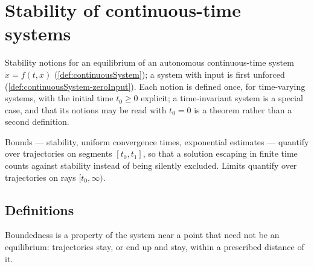 
\chapter{Stability of continuous-time systems}

Stability notions for an equilibrium of an autonomous continuous-time system $\dot x = f(t, x)$
(\cref{def:continuousSystem}); a system with input is first unforced
(\cref{def:continuousSystem-zeroInput}). Each notion is defined once, for time-varying systems,
with the initial time $t_0 \ge 0$ explicit; a time-invariant system is a special case, and that
its notions may be read with $t_0 = 0$ is a theorem rather than a second definition.

Bounds --- stability, uniform convergence times, exponential estimates --- quantify over
trajectories on segments $[t_0, t_1]$, so that a solution escaping in finite time counts against
stability instead of being silently excluded. Limits quantify over trajectories on rays
$[t_0, \infty)$.

\section{Definitions}












Boundedness is a property of the system near a point that need not be an equilibrium:
trajectories stay, or end up and stay, within a prescribed distance of it.

